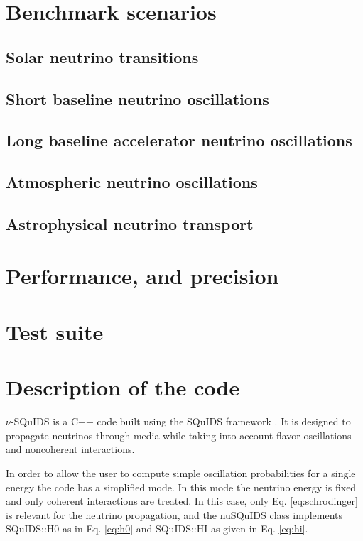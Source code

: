 \documentclass[3p,12pt]{elsarticle}
\newcommand{\ttf}{\ttfamily}
\begin{document}
\section{Benchmark scenarios}
\label{sec:benchmark} 

\subsection{Solar neutrino transitions}

\subsection{Short baseline neutrino oscillations}

\subsection{Long baseline accelerator neutrino oscillations}

\subsection{Atmospheric neutrino oscillations}

\subsection{Astrophysical neutrino transport}



\section{Performance, and precision}
\label{sec:performance} 

\section{Test suite}
\label{sec:tests} 

\section{Description of the code} 
\label{sec:code} 

$\nu$-SQuIDS is a {\ttf C++} code built using the SQuIDS
framework \citep{SQUIDS}. It is designed to propagate neutrinos
through media while taking into account flavor oscillations and
noncoherent interactions. 

In order to allow the user to compute simple oscillation probabilities
for a single energy the code has a simplified mode.
In this mode the neutrino energy is fixed and only coherent interactions
are treated.
In this case, only Eq. \eqref{eq:schrodinger} is relevant for the
neutrino propagation, and the {\ttf nuSQuIDS} class implements {\ttf
  SQuIDS::H0} as in Eq. \eqref{eq:h0} and {\ttf SQuIDS::HI} as given
in Eq. \eqref{eq:hi}. 
\end{document}
